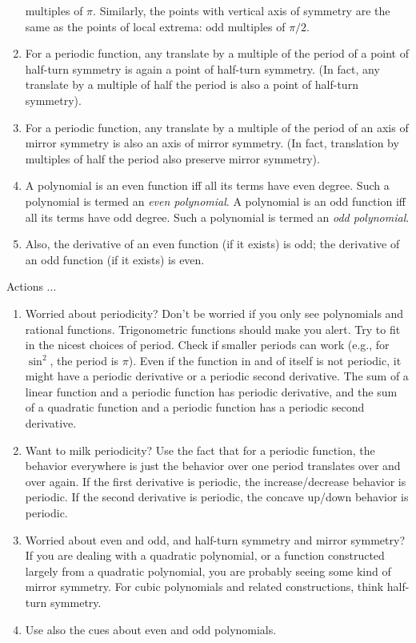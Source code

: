 \documentclass[10pt]{amsart}
\begin{document}
\begin{enumerate}
  multiples of $\pi$. Similarly, the points with vertical axis of
  symmetry are the same as the points of local extrema: odd multiples
  of $\pi/2$.
\item For a periodic function, any translate by a multiple of the
  period of a point of half-turn symmetry is again a point of
  half-turn symmetry. (In fact, any translate by a multiple of half
  the period is also a point of half-turn symmetry).
\item For a periodic function, any translate by a multiple of the
  period of an axis of mirror symmetry is also an axis of mirror
  symmetry. (In fact, translation by multiples of half the period also
  preserve mirror symmetry).
\item A polynomial is an even function iff all its terms have even
  degree. Such a polynomial is termed an {\em even polynomial}. A
  polynomial is an odd function iff all its terms have odd
  degree. Such a polynomial is termed an {\em odd polynomial}.
\item Also, the derivative of an even function (if it exists) is odd;
  the derivative of an odd function (if it exists) is even.
\end{enumerate}

Actions ...

\begin{enumerate}
\item Worried about periodicity? Don't be worried if you only see
  polynomials and rational functions. Trigonometric functions should
  make you alert. Try to fit in the nicest choices of period. Check if
  smaller periods can work (e.g., for $\sin^2$, the period is
  $\pi$). Even if the function in and of itself is not periodic, it
  might have a periodic derivative or a periodic second
  derivative. The sum of a linear function and a periodic function has
  periodic derivative, and the sum of a quadratic function and a
  periodic function has a periodic second derivative.
\item Want to milk periodicity? Use the fact that for a periodic
  function, the behavior everywhere is just the behavior over one
  period translates over and over again. If the first derivative is
  periodic, the increase/decrease behavior is periodic. If the second
  derivative is periodic, the concave up/down behavior is periodic.
\item Worried about even and odd, and half-turn symmetry and mirror
  symmetry? If you are dealing with a quadratic polynomial, or a
  function constructed largely from a quadratic polynomial, you are
  probably seeing some kind of mirror symmetry. For cubic polynomials
  and related constructions, think half-turn symmetry.
\item Use also the cues about even and odd polynomials.
\end{enumerate}
\end{document}
